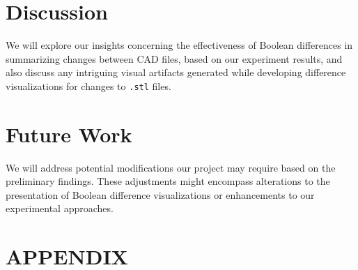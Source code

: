 \documentclass[sigconf,authorversion,nonacm]{acmart}
\begin{document}
\section{Discussion}

We will explore our insights concerning the effectiveness of Boolean differences in summarizing changes between CAD files, based on our experiment results, and also discuss any intriguing visual artifacts generated while developing difference visualizations for changes to \texttt{.stl} files.

\section{Future Work}
We will address potential modifications our project may require based on the preliminary findings. These adjustments might encompass alterations to the presentation of Boolean difference visualizations or enhancements to our experimental approaches.



\appendix
\section*{APPENDIX}
\end{document}
